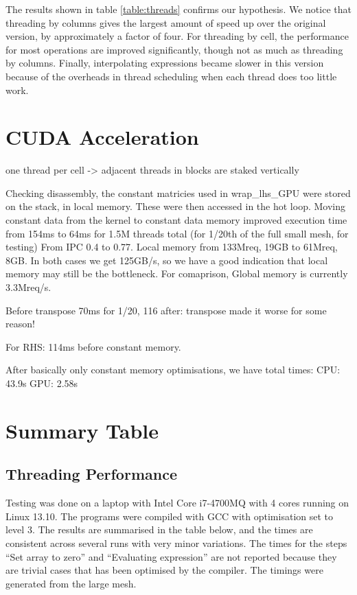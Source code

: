 \documentclass{article}
\begin{document}
The results shown in table \ref{table:threads} confirms our hypothesis. We notice that threading by columns gives the largest amount of speed up over the original version, by approximately a factor of four. For threading by cell, the performance for most operations are improved significantly, though not as much as threading by columns. Finally, interpolating expressions became slower in this version because of the overheads in thread scheduling when each thread does too little work.

\section{CUDA Acceleration}

one thread per cell -> adjacent threads in blocks are staked vertically

Checking disassembly, the constant matricies used in wrap_lhs_GPU were stored on the stack, in local memory. These were then accessed in the hot loop.
Moving constant data from the kernel to constant data memory improved execution time from 154ms to 64ms for 1.5M threads total (for 1/20th of the full small mesh, for testing)
From IPC 0.4 to 0.77.
Local memory from 133Mreq, 19GB to 61Mreq, 8GB.
In both cases we get 125GB/s, so we have a good indication that local memory may still be the bottleneck.
For comaprison, Global memory is currently 3.3Mreq/s.

Before transpose 70ms for 1/20, 116 after: transpose made it worse for some reason!

For RHS: 114ms before constant memory.

After basically only constant memory optimisations, we have total times:
CPU: 43.9s
GPU: 2.58s


\section{Summary Table}
\subsection{Threading Performance}
Testing was done on a laptop with Intel Core i7-4700MQ with 4 cores running on Linux 13.10. The programs were compiled with GCC with optimisation set to level 3. The results are summarised in the table below, and the times are consistent across several runs with very minor variations. The times for the steps ``Set array to zero'' and ``Evaluating expression'' are not reported because they are trivial cases that has been optimised by the compiler. The timings were generated from the large mesh.
\end{document}
